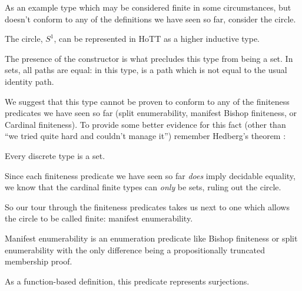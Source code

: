As an example type which may be considered finite in some circumstances, but
doesn't conform to any of the definitions we have seen so far, consider the
circle.
\begin{definition}[\(S^1\)] \label{circle-def}
  The circle, \(S^1\), can be represented in HoTT as a higher inductive type.
  \begin{agdalisting}
  \end{agdalisting}
  The presence of the  constructor is what
  precludes this type from being a set.
  In sets, all paths are equal: in this type,  is a
  path which is not equal to the usual identity path.
\end{definition}

We suggest that this type cannot be proven to conform to any of the finiteness
predicates we have seen so far (split enumerability, manifest Bishop finiteness,
or Cardinal finiteness).
To provide some better evidence for this fact (other than ``we tried quite hard
and couldn't manage it'') remember Hedberg's theorem
\cite{hedbergCoherenceTheoremMartinLof1998}:
\begin{theorem}
  Every discrete type is a set.
\end{theorem}
Since each finiteness predicate we have seen so far \emph{does} imply decidable
equality, we know that the cardinal finite types can \emph{only} be sets, ruling
out the circle.

So our tour through the finiteness predicates takes us next to one which allows
the circle to be called finite: manifest enumerability.
\begin{definition}
  Manifest enumerability is an enumeration predicate like Bishop finiteness or
  split enumerability with the only difference being a propositionally truncated
  membership proof.
  \begin{agdalisting}
  \end{agdalisting}
\end{definition}
As a function-based definition, this predicate represents surjections.

